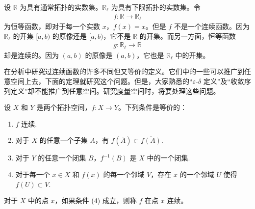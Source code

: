 \documentclass[../../main.tex]{subfiles}
\begin{document}
\begin{example}\label{example:ch02-恒等映射}
设 $\mathbb{R}$ 为具有通常拓扑的实数集。$\mathbb{R}_{\ell}$ 为具有下限拓扑的实数集。令
\begin{align*}
f: \mathbb{R} \longrightarrow \mathbb{R}_{\ell}
\end{align*}
为恒等函数，即对于每一个实数 $x$，$f(x) = x$。但是 $f$ 不是一个连续函数。因为 $\mathbb{R}_{\ell}$ 的开集 $[a, b)$ 的原像还是 $[a, b)$，它不是 $\mathbb{R}$ 的开集。而另一方面，恒等函数
\begin{align*}
g: \mathbb{R}_{\ell} \longrightarrow \mathbb{R}
\end{align*}
却是连续的。因为 $(a, b)$ 的原像是 $(a, b)$，它也是 $\mathbb{R}_{\ell}$ 中的开集。
\end{example}

在分析中研究过连续函数的许多不同但又等价的定义。它们中的一些可以推广到任意空间上去，下面的定理就研究这个问题。但是，大家熟悉的“$\varepsilon$-$\delta$ 定义”及“收敛序列定义”却不能推广到任意空间。研究度量空间时，将要处理这些问题。

\begin{theorem}[连续函数的等价刻画]\label{theorem:ch02-连续等价}
设 $X$ 和 $Y$ 是两个拓扑空间，$f: X \rightarrow Y$。下列条件是等价的：
\begin{enumerate}[(1)]
\item $f$ 连续.
\item 对于 $X$ 的任意一个子集 $A$，有 $f(\overline{A}) \subset \overline{f(A)}$.
\item 对于 $Y$ 的任意一个闭集 $B$，$f^{-1}(B)$ 是 $X$ 中的一个闭集.
\item 对于每一个 $x \in X$ 和 $f(x)$ 的每一个邻域 $V$，存在 $x$ 的一个邻域 $U$ 使得 $f(U) \subset V$.
\end{enumerate}
对于 $X$ 中的点 $x$，如果条件 (4) 成立，则称 $f$ 在点 $x$ 连续。
\end{theorem}
\end{document}
